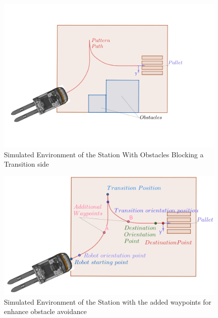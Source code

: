 \begin{figure}[H]
    \begin{center}
        \includegraphics[width=5in]{images/Chap2/Obstacles_In_Station.png} %
        \caption{Simulated Environment of the Station With Obstacles Blocking a Transition side}
        \label{Obstacle}
        \end{center}    
\end{figure}


\begin{figure}[H]
    \begin{center}
        \includegraphics[width=4.5in]{images/Chap2/Add_waypoints.png} %
        \caption{Simulated Environment of the Station with the added waypoints for enhance obstacle avoidance}
        \label{Add_waypoints}
        \end{center}    
\end{figure}



